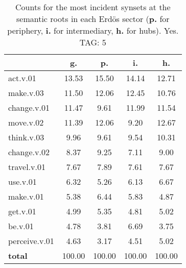 \begin{table}[h!]
\begin{center}
\begin{tabular}{| l || c | c | c | c |}\hline
 & {\bf g.} & {\bf p.} & {\bf i.} & {\bf h.} \\\hline\hline
act.v.01 & 13.53  & 15.50  & 14.14  & 12.71 \\\hline
make.v.03 & 11.50  & 12.06  & 12.45  & 10.76 \\\hline
change.v.01 & 11.47  & 9.61  & 11.99  & 11.54 \\\hline
move.v.02 & 11.39  & 12.06  & 9.20  & 12.67 \\\hline
think.v.03 & 9.96  & 9.61  & 9.54  & 10.31 \\\hline
change.v.02 & 8.37  & 9.25  & 7.11  & 9.00 \\\hline
travel.v.01 & 7.67  & 7.89  & 7.61  & 7.67 \\\hline
use.v.01 & 6.32  & 5.26  & 6.13  & 6.67 \\\hline
make.v.01 & 5.38  & 6.44  & 5.83  & 4.87 \\\hline
get.v.01 & 4.99  & 5.35  & 4.81  & 5.02 \\\hline
be.v.01 & 4.78  & 3.81  & 6.69  & 3.75 \\\hline
perceive.v.01 & 4.63  & 3.17  & 4.51  & 5.02 \\\hline\hline
{{\bf total}} & 100.00  & 100.00  & 100.00  & 100.00 \\\hline
\end{tabular}
\caption{Counts for the most incident synsets at the semantic roots in each Erd\"os sector ({\bf p.} for periphery, {\bf i.} for intermediary, {\bf h.} for hubs). Yes. TAG: 5}
\end{center}
\end{table}